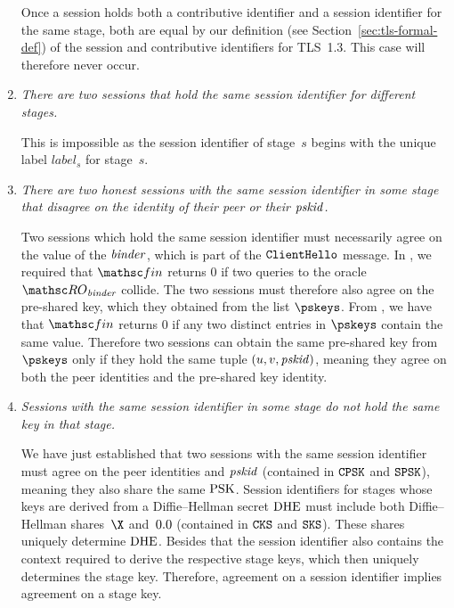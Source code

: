 \begin{enumerate}
		Once a session holds both a contributive identifier and a session identifier for the same stage, both are equal by our definition (see Section~\ref{sec:tls-formal-def}) of the session and contributive identifiers for TLS~1.3.
		This case will therefore never occur.
		
		\item \textit{There are two sessions that hold the same session identifier for different stages.}
		
		This is impossible as the session identifier of stage~$s$ begins with the unique label $\mathit{label}_s$ for stage~$s$.
		
		\item \textit{There are two honest sessions with the same session identifier in some stage that disagree on the identity of their peer or their $\mathit{pskid}$.}
		
		Two sessions which hold the same session identifier must necessarily agree on the value of the $\mathit{binder}$, which is part of the $\mathtt{ClientHello}$ message.
		In , we required that $\Finalize$ returns $0$ if two queries to the oracle $\RObinder$ collide. 
		The two sessions must therefore also agree on the pre-shared key, which they obtained from the list $\pskeys$.
		From , we have that $\Finalize$ returns $0$ if any two distinct entries in $\pskeys$ contain the same value.
		Therefore two sessions can obtain the same pre-shared key from $\pskeys$ only if they hold the same tuple $(u, v, \mathit{pskid})$, meaning they agree on both the peer identities and the pre-shared key identity.
		\item \textit{Sessions with the same session identifier in some stage do not hold the same key in that stage.}
		
		We have just established that two sessions with the same session identifier must agree on the peer identities and $\mathit{pskid}$ (contained in $\mathtt{CPSK}$ and $\mathtt{SPSK}$), meaning they also share the same $\mathrm{PSK}$. 
		Session identifiers for stages whose keys are derived from a Diffie--Hellman secret $\mathrm{DHE}$ must include both Diffie--Hellman shares~$\X$ and~$\Y$ (contained in $\mathtt{CKS}$ and $\mathtt{SKS}$). 
		These shares uniquely determine $\mathrm{DHE}$. 
		Besides that the session identifier also contains the context required to derive the respective stage keys, which then uniquely determines the stage key.
		Therefore, agreement on a session identifier implies agreement on a stage key.
	\end{enumerate}

